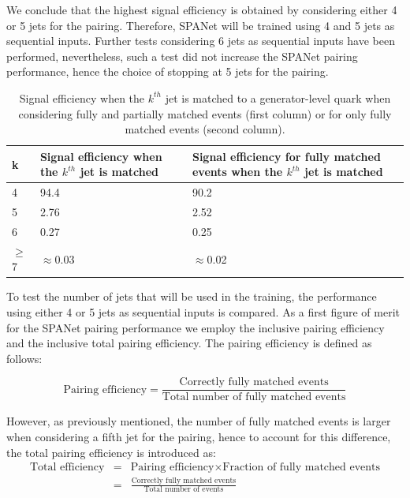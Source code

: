 We conclude that the highest signal efficiency is obtained by considering either 4 or 5 jets for the pairing. Therefore, SPANet will be trained using 4 and 5 jets as sequential inputs. Further tests considering 6 jets as sequential inputs have been performed, nevertheless, such a test did not increase the SPANet pairing performance, hence the choice of stopping at 5 jets for the pairing.


\begin{table}[h!]
\centering
\begin{tabular}{|p{1cm}||p{6cm}||p{6cm}|}
 \hline
 k& Signal efficiency when the $k^{th}$ jet is matched& Signal efficiency for fully matched events when the $k^{th}$ jet is matched\\
 \hline
 4 &  94.4 & 90.2\\
 5 & 2.76 & 2.52 \\
 6 & 0.27 & 0.25 \\
 $\geq$7 &  $\approx$0.03 &  $\approx$0.02 \\
 \hline
\end{tabular}
\caption{Signal efficiency when the $k^{th}$ jet is matched to a generator-level quark when considering fully and partially matched events (first column) or for only fully matched events (second column). }
\label{table:signal_efficiency}
\end{table}

To test the number of jets that will be used in the training, the performance using either 4 or 5 jets as sequential inputs is compared. As a first figure of merit for the SPANet pairing performance we employ the inclusive pairing efficiency and the inclusive total pairing efficiency. The pairing efficiency is defined as follows:

\begin{equation*}
    \text{Pairing efficiency}=\frac{\text{Correctly fully matched events}}{\text{Total number of fully matched events}}
\end{equation*}

However, as previously mentioned, the number of fully matched events is larger when considering a fifth jet for the pairing, hence to account for this difference, the total pairing efficiency is introduced as:
\vspace{-0.2cm}
\begin{eqnarray*}
\text{Total efficiency} & = & \text{Pairing efficiency} \times \text{Fraction of fully matched events} \\
& = &\frac{\text{Correctly fully matched events}}{\text{Total number of events}}     
\end{eqnarray*}

